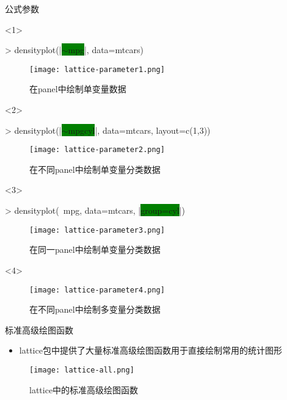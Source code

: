 \begin{frame}[t,fragile]{\subsecname}{公式参数}
\begin{onlyenv}<1>
\begin{rcode}
> densityplot(|\colorbox{green}{$\sim$mpg}|, data=mtcars)
\end{rcode}
\begin{figure}
  \texttt{[image: lattice-parameter1.png]}
  \caption{在panel中绘制单变量数据}
\end{figure}
\end{onlyenv}

\begin{onlyenv}<2>
\begin{rcode}
> densityplot(|\colorbox{green}{$\sim$mpg\textbar cyl}|, data=mtcars, layout=c(1,3))
\end{rcode}
\begin{figure}
  \texttt{[image: lattice-parameter2.png]}
  \caption{在不同panel中绘制单变量分类数据}
\end{figure}
\end{onlyenv}

\begin{onlyenv}<3>
\begin{rcode}
> densityplot(~mpg, data=mtcars, |\colorbox{green}{group=cyl}|)
\end{rcode}
\begin{figure}
  \texttt{[image: lattice-parameter3.png]}
  \caption{在同一panel中绘制单变量分类数据}
\end{figure}
\end{onlyenv}

\begin{onlyenv}<4>
\begin{figure}
  \texttt{[image: lattice-parameter4.png]}
  \caption{在不同panel中绘制多变量分类数据}
\end{figure}
\end{onlyenv}
\end{frame} 

\begin{frame}[t]{\subsecname}{标准高级绘图函数}
\begin{itemize}
\item lattice包中提供了大量标准高级绘图函数用于直接绘制常用的统计图形
\end{itemize}
\vspace{-5pt}
\begin{figure}\centering
    \texttt{[image: lattice-all.png]}
    \caption{lattice中的标准高级绘图函数}
\end{figure}
\end{frame} 

